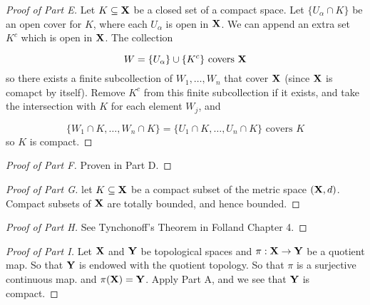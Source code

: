 \documentclass[../../main.tex]{subfiles}
\begin{document}
\begin{proof}[Proof of  Part E]
    Let $K\subseteq {\mathbf{X}}$ be a closed set of a compact space. Let $\{U_\alpha\cap K\}$ be an open cover for $K$, where each $U_\alpha$ is open in ${\mathbf{X}}$. We can append an extra set $K^c$ which is open in ${\mathbf{X}}$. The collection

    \[
        W = \{U_\alpha\}\cup \{K^c\} \text{ covers }{\mathbf{X}}
    \]
    so there exists a finite subcollection of $W_1,\ldots, W_n$ that cover ${\mathbf{X}}$ (since ${\mathbf{X}}$ is comapct by itself). Remove $K^c$ from this finite subcollection if it exists, and take the intersection with $K$ for each element $W_j$, and

    \[
        \{W_1\cap K,\ldots, W_n\cap K\} = \{U_1\cap K,\ldots, U_n\cap K\}\text{ covers }K
    \]
    so $K$ is compact.
\end{proof}
    
\begin{proof}[Proof of  Part F]
    Proven in Part D.
\end{proof}
    
\begin{proof}[Proof of  Part G]
    let $K\subseteq {\mathbf{X}}$ be a compact subset of the metric space $({\mathbf{X}},d)$. Compact subsets of ${\mathbf{X}}$ are totally bounded, and hence bounded.
\end{proof}

\begin{proof}[Proof of  Part H]
    See Tynchonoff's Theorem in Folland Chapter 4.
\end{proof}

\begin{proof}[Proof of  Part I]
    Let ${\mathbf{X}}$ and ${\mathbf{Y}}$ be topological spaces and $\pi: {\mathbf{X}}\to{\mathbf{Y}}$ be a quotient map. So that ${\mathbf{Y}}$ is endowed with the quotient topology. So that $\pi$ is a surjective continuous map. and $\pi({\mathbf{X}})={\mathbf{Y}}$. Apply Part A, and we see that ${\mathbf{Y}}$ is compact.
\end{proof}
\end{document}
